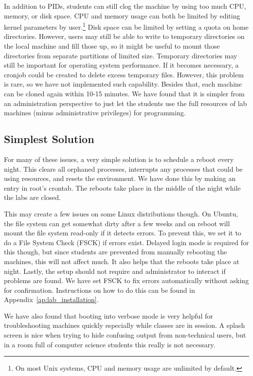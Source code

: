 In addition to PIDs, students can still clog the machine by using too much CPU, memory, or disk space.  CPU and memory usage can both be limited by editing kernel parameters by user.\footnote{On most Unix systems, CPU and memory usage are unlimited by default.}  Disk space can be limited by setting a quota on home directories.  However, users may still be able to write to temporary directories on the local machine and fill those up, so it might be useful to mount those directories from separate partitions of limited size.  Temporary directories may still be important for operating system performance.  If it becomes necessary, a cronjob could be created to delete excess temporary files.  However, this problem is rare, so we have not implemented such capability.  Besides that, each machine can be cloned again within 10-15 minutes.  We have found that it is simpler from an administration perspective to just let the students use the full resources of lab machines (minus administrative privileges) for programming.  

\subsection{Simplest Solution}
For many of these issues, a very simple solution is to schedule a reboot every night.  This clears all orphaned processes, interrupts any processes that could be using resources, and resets the environment.  We have done this by making an entry in root's crontab.  The reboots take place in the middle of the night while the labs are closed. 

This may create a few issues on some Linux distributions though.  On Ubuntu, the file system can get somewhat dirty after a few weeks and on reboot will mount the file system read-only if it detects errors.  To prevent this, we set it to do a File System Check (FSCK) if errors exist.  Delayed login mode is required for this though, but since students are prevented from manually rebooting the machines, this will not affect much.  It also helps that the reboots take place at night.  Lastly, the setup should not require and administrator to interact if problems are found.  We have set FSCK to fix errors automatically without asking for confirmation.  Instructions on how to do this can be found in Appendix~\ref{ap:lab_installation}.

We have also found that booting into verbose mode is very helpful for troubleshooting machines quickly especially while classes are in session.  A splash screen is nice when trying to hide confusing output from non-technical users, but in a room full of computer science students this really is not necessary.  
